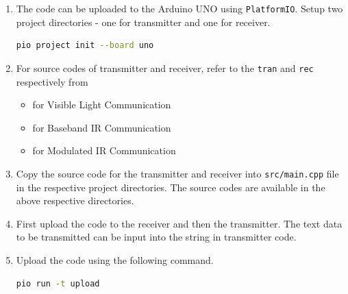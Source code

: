 \documentclass[conference]{IEEEtran}
\begin{document}
\begin{enumerate}
\item The code can be uploaded to the Arduino UNO using \texttt{PlatformIO}. Setup two project directories - one for transmitter and one for receiver.
	\begin{lstlisting}[language=bash]
	pio project init --board uno
    \end{lstlisting}
\item For source codes of transmitter and receiver, refer to the \texttt{tran} and \texttt{rec} respectively from
\begin{itemize}
\item {} for Visible Light Communication
\item {} for Baseband IR Communication
\item {} for Modulated IR Communication
\end{itemize}
\item Copy the source code for the transmitter and receiver into \texttt{src/main.cpp} file in the respective project directories. The source codes are available in the above respective directories.
\item First upload the code to the receiver and then the transmitter. The text data to be transmitted can be input into the string in transmitter code.
\item Upload the code using the following command.
	\begin{lstlisting}[language=bash]
	pio run -t upload
    \end{lstlisting}
    
\end{enumerate}
\end{document}
